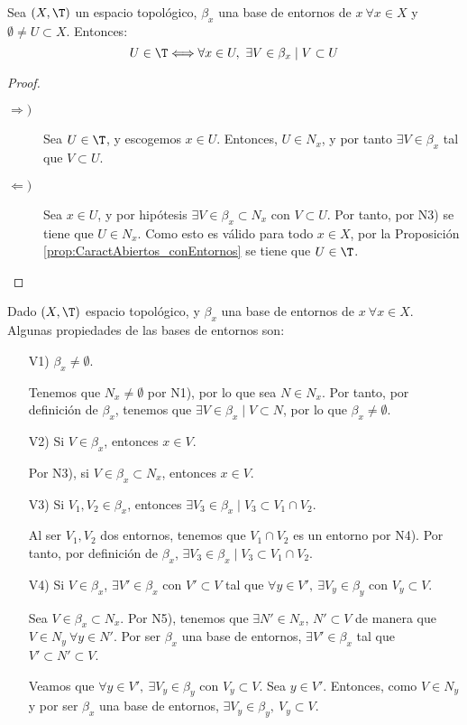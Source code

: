 \begin{prop}\label{prop:CaractAbiertos_conBasesEntornos}
    Sea $(X,\T)$ un espacio topológico, $\beta_x$ una base de entornos de $x~\forall x\in X$ y $\emptyset\neq U\subset X$. Entonces:
    \begin{equation*}
        U\in \T \Longleftrightarrow \forall x\in U,~\exists V\in \beta_x\mid V\subset U
    \end{equation*}
\end{prop}
\begin{proof}\
    \begin{description}
        \item[$\Longrightarrow)$] Sea $U\in \T$, y escogemos $x\in U$. Entonces, $U\in N_x$, y por tanto $\exists V\in \beta_x$ tal que $V\subset U$.
        
        \item[$\Longleftarrow)$] Sea $x\in U$, y por hipótesis $\exists V\in \beta_x\subset N_x$ con $V\subset U$. Por tanto, por N3) se tiene que $U\in N_x$. Como esto es válido para todo $x\in X$, por la Proposición \ref{prop:CaractAbiertos_conEntornos} se tiene que $U\in \T$.
    \end{description}
\end{proof}


Dado $(X,\T)$ espacio topológico, y $\beta_x$ una base de entornos de $x~\forall x\in X$. Algunas propiedades de las bases de entornos son:
\begin{enumerate}
    \item[V1)] $\beta_x\neq \emptyset$.

    Tenemos que $N_x\neq \emptyset$ por N1), por lo que sea $N\in N_x$. Por tanto, por definición de $\beta_x$, tenemos que $\exists V\in \beta_x\mid V\subset N$, por lo que $\beta_x\neq \emptyset$.
    
    \item[V2)] Si $V\in \beta_x$, entonces $x\in V$.

    Por N3), si $V\in \beta_x\subset N_x$, entonces $x\in V$.
    
    \item[V3)] Si $V_1,V_2\in \beta_x$, entonces $\exists V_3\in \beta_x\mid V_3\subset V_1\cap V_2$.

    Al ser $V_1, V_2$ dos entornos, tenemos que $V_1\cap V_2$ es un entorno por N4). Por tanto, por definición de $\beta_x$, $\exists V_3\in \beta_x\mid V_3\subset V_1\cap V_2$.

    \item[V4)] Si $V\in \beta_x$, $\exists V'\in \beta_x$ con $V'\subset V$ tal que $\forall y\in V',~\exists V_y\in \beta_y$ con $V_y\subset V$.

    Sea $V\in \beta_x\subset N_x$. Por N5), tenemos que $\exists N'\in N_x$, $N'\subset V$ de manera que $V\in N_y~\forall y\in N'$. Por ser $\beta_x$ una base de entornos, $\exists V'\in \beta_x$ tal que $V'\subset N'\subset V$.

    Veamos que $\forall y\in V',~\exists V_y\in \beta_y$ con $V_y\subset V$. Sea $y\in V'$. Entonces, como $V\in N_y$ y por ser $\beta_x$ una base de entornos, $\exists V_y\in \beta_y,~V_y\subset V$.
\end{enumerate}

